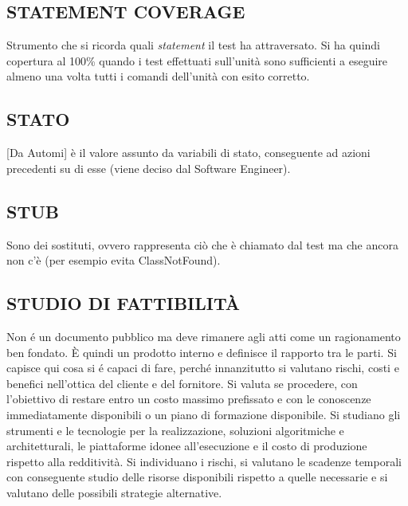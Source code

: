 		\subsection{STATEMENT COVERAGE}	\label{statementcoverage}	
		Strumento che si ricorda quali \textit{statement} il test ha attraversato. Si ha quindi copertura al 100\% quando i test effettuati sull'unità sono sufficienti a eseguire almeno una volta tutti i comandi dell'unità con esito corretto.
					
			
		\subsection{STATO}  \label{stato}
		[Da Automi] è il valore assunto da variabili di stato, conseguente ad azioni precedenti su di esse (viene deciso dal Software Engineer).
		
		\subsection{STUB}		\label{stub}
		Sono dei sostituti, ovvero rappresenta ciò che è chiamato dal test ma che ancora non c'è (per esempio evita ClassNotFound).
	
		\subsection{STUDIO DI FATTIBILITÀ}  \label{studiofattibilita}
		Non é un documento pubblico ma deve rimanere agli atti come un ragionamento ben fondato. È quindi un prodotto interno e definisce il rapporto tra le parti. Si capisce qui cosa si é capaci di fare, perché innanzitutto si valutano rischi, costi e benefici nell'ottica del cliente e del fornitore. Si valuta se procedere, con l’obiettivo di restare entro un costo massimo prefissato e con le conoscenze immediatamente disponibili o un piano di formazione disponibile. Si studiano gli strumenti e le tecnologie per la realizzazione, soluzioni algoritmiche e architetturali, le piattaforme idonee all'esecuzione e il costo di produzione rispetto alla redditività. Si individuano i rischi, si valutano le scadenze temporali con conseguente studio delle risorse disponibili rispetto a quelle necessarie e si valutano delle possibili strategie alternative.
	
	
